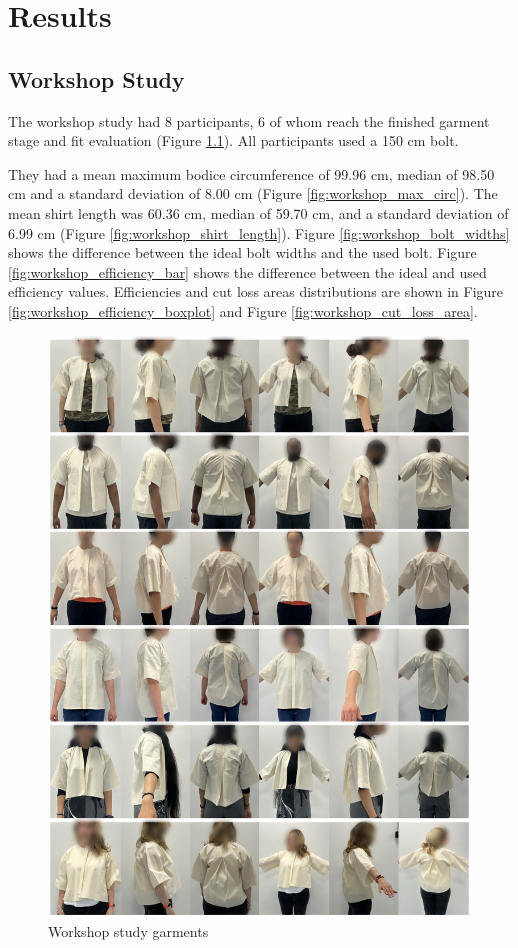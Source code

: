 \chapter{Results}

\section{Workshop Study}
The workshop study had 8 participants, 6 of whom reach the finished garment stage and fit evaluation (Figure \ref{fig:workshop_garments}). All participants used a 150 cm bolt.

They had a mean maximum bodice circumference of 99.96 cm, median of 98.50 cm and a standard deviation of 8.00 cm (Figure \ref{fig:workshop_max_circ}). The mean shirt length was 60.36 cm, median of 59.70 cm, and a standard deviation of 6.99 cm (Figure \ref{fig:workshop_shirt_length}).
Figure \ref{fig:workshop_bolt_widths} shows the difference between the ideal bolt widths and the used bolt. Figure \ref{fig:workshop_efficiency_bar} shows the difference between the ideal and used efficiency values. Efficiencies and cut loss areas distributions are shown in Figure \ref{fig:workshop_efficiency_boxplot} and Figure \ref{fig:workshop_cut_loss_area}.
\newpage
\begin{figure} [H]
    \centering
    \includegraphics[width = \textwidth]{Images/workshop garments.png}
    \caption{Workshop study garments}
    \label{fig:workshop_garments}
\end{figure}


